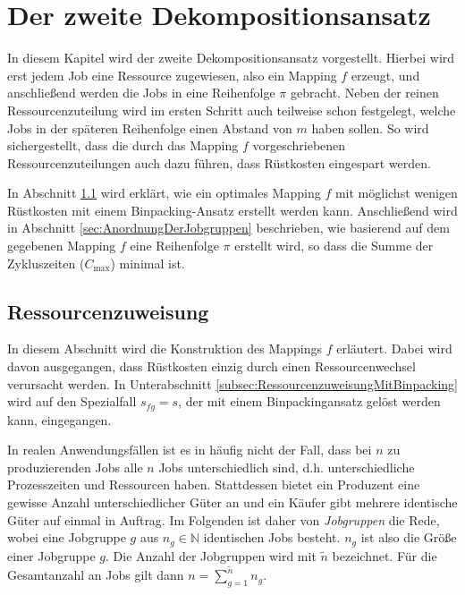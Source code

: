 \documentclass{scrreprt}
\begin{document}
\chapter{Der zweite Dekompositionsansatz}
In diesem Kapitel wird der zweite Dekompositionsansatz vorgestellt.
Hierbei wird erst jedem Job eine Ressource zugewiesen, also ein Mapping $f$ erzeugt,
und anschließend werden die Jobs in eine Reihenfolge $\pi$ gebracht.
Neben der reinen Ressourcenzuteilung wird im ersten Schritt auch teilweise schon festgelegt, welche Jobs in der späteren Reihenfolge einen Abstand von $m$ haben sollen.
So wird sichergestellt, dass die durch das Mapping $f$ vorgeschriebenen Ressourcenzuteilungen auch dazu führen, dass Rüstkosten eingespart werden.

In Abschnitt \ref{sec:Ressourcenzuweisung} wird erklärt, wie ein optimales Mapping $f$ mit möglichst wenigen Rüstkosten mit einem Binpacking-Ansatz erstellt werden kann.
Anschließend wird in Abschnitt \ref{sec:AnordnungDerJobgruppen} beschrieben, wie basierend auf dem gegebenen Mapping $f$ eine Reihenfolge $\pi$ erstellt wird,
so dass die Summe der Zykluszeiten ($C_{\max}$) minimal ist.


\section{Ressourcenzuweisung}
\label{sec:Ressourcenzuweisung}
In diesem Abschnitt wird die Konstruktion des Mappings $f$ erläutert.
Dabei wird davon ausgegangen, dass Rüstkosten einzig durch einen Ressourcenwechsel verursacht werden.
In Unterabschnitt \ref{subsec:RessourcenzuweisungMitBinpacking} wird auf den Spezialfall $s_{fg}=s$, der mit einem Binpackingansatz gelöst werden kann,
eingegangen.

In realen Anwendungsfällen ist es in häufig nicht der Fall, dass bei $n$ zu produzierenden Jobs alle $n$ Jobs unterschiedlich sind,
d.h. unterschiedliche Prozesszeiten und Ressourcen haben.
Stattdessen bietet ein Produzent eine gewisse Anzahl unterschiedlicher Güter an und ein Käufer gibt mehrere identische Güter auf einmal in Auftrag.
Im Folgenden ist daher von \textit{Jobgruppen} die Rede, wobei eine Jobgruppe $g$ aus $n_g\in\mathbb{N}$ identischen Jobs besteht.
$n_g$ ist also die Größe einer Jobgruppe $g$.
Die Anzahl der Jobgruppen wird mit $\tilde{n}$ bezeichnet.
Für die Gesamtanzahl an Jobs gilt dann $n = \sum_{g=1}^{\tilde{n}} n_g$.

\end{document}
